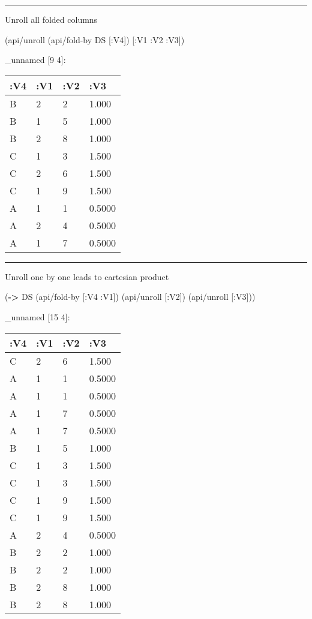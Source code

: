\documentclass[]{article}
\newenvironment{Shaded}{\begin{snugshade}}{\end{snugshade}}
\newcommand{\AttributeTok}[1]{\textcolor[rgb]{0.77,0.63,0.00}{#1}}
\newcommand{\KeywordTok}[1]{\textcolor[rgb]{0.13,0.29,0.53}{\textbf{#1}}}
\newcommand{\NormalTok}[1]{#1}
\begin{document}
\begin{center}\rule{0.5\linewidth}{0.5pt}\end{center}

Unroll all folded columns

\begin{Shaded}
\begin{Highlighting}[]
\NormalTok{(api/unroll (api/fold-by DS [}\AttributeTok{:V4}\NormalTok{]) [}\AttributeTok{:V1} \AttributeTok{:V2} \AttributeTok{:V3}\NormalTok{])}
\end{Highlighting}
\end{Shaded}

\_unnamed {[}9 4{]}:

\begin{longtable}[]{@{}llll@{}}
\toprule
:V4 & :V1 & :V2 & :V3\tabularnewline
\midrule
\endhead
B & 2 & 2 & 1.000\tabularnewline
B & 1 & 5 & 1.000\tabularnewline
B & 2 & 8 & 1.000\tabularnewline
C & 1 & 3 & 1.500\tabularnewline
C & 2 & 6 & 1.500\tabularnewline
C & 1 & 9 & 1.500\tabularnewline
A & 1 & 1 & 0.5000\tabularnewline
A & 2 & 4 & 0.5000\tabularnewline
A & 1 & 7 & 0.5000\tabularnewline
\bottomrule
\end{longtable}

\begin{center}\rule{0.5\linewidth}{0.5pt}\end{center}

Unroll one by one leads to cartesian product

\begin{Shaded}
\begin{Highlighting}[]
\NormalTok{(}\KeywordTok{->}\NormalTok{ DS}
\NormalTok{    (api/fold-by [}\AttributeTok{:V4} \AttributeTok{:V1}\NormalTok{])}
\NormalTok{    (api/unroll [}\AttributeTok{:V2}\NormalTok{])}
\NormalTok{    (api/unroll [}\AttributeTok{:V3}\NormalTok{]))}
\end{Highlighting}
\end{Shaded}

\_unnamed {[}15 4{]}:

\begin{longtable}[]{@{}llll@{}}
\toprule
:V4 & :V1 & :V2 & :V3\tabularnewline
\midrule
\endhead
C & 2 & 6 & 1.500\tabularnewline
A & 1 & 1 & 0.5000\tabularnewline
A & 1 & 1 & 0.5000\tabularnewline
A & 1 & 7 & 0.5000\tabularnewline
A & 1 & 7 & 0.5000\tabularnewline
B & 1 & 5 & 1.000\tabularnewline
C & 1 & 3 & 1.500\tabularnewline
C & 1 & 3 & 1.500\tabularnewline
C & 1 & 9 & 1.500\tabularnewline
C & 1 & 9 & 1.500\tabularnewline
A & 2 & 4 & 0.5000\tabularnewline
B & 2 & 2 & 1.000\tabularnewline
B & 2 & 2 & 1.000\tabularnewline
B & 2 & 8 & 1.000\tabularnewline
B & 2 & 8 & 1.000\tabularnewline
\bottomrule
\end{longtable}
\end{document}
